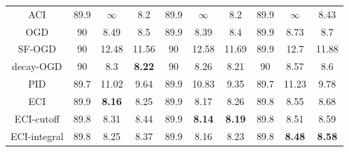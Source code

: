 \begin{table}[ht]
\begin{center}
\begin{tabular}{c|ccc|ccc|ccc}
ACI                   & 89.9 & $\infty$           & 8.2           & 89.9 & $\infty$           & 8.2           & 89.9 & $\infty$           & 8.43          \\
OGD                   & 90   & 8.49          & 8.5           & 89.9 & 8.39          & 8.4           & 89.9 & 8.73          & 8.7           \\
SF-OGD                & 90   & 12.48         & 11.56         & 90   & 12.58         & 11.69         & 89.9 & 12.7          & 11.88         \\
decay-OGD             & 90   & 8.3           & \textbf{8.22} & 90   & 8.26          & 8.21          & 90   & 8.57          & 8.6           \\
PID                   & 89.7 & 11.02         & 9.64          & 89.9 & 10.83         & 9.35          & 89.7 & 11.23         & 9.78          \\
ECI                   & 89.9 & \textbf{8.16} & 8.25          & 89.9 & 8.17          & 8.26          & 89.8 & 8.55          & 8.68          \\
ECI-cutoff            & 89.8 & 8.31          & 8.44          & 89.9 & \textbf{8.14} & \textbf{8.19} & 89.8 & 8.51          & 8.59          \\
ECI-integral          & 89.8 & 8.25          & 8.37          & 89.9 & 8.16          & 8.23          & 89.8 & \textbf{8.48} & \textbf{8.58}                \\ \hline
\end{tabular}
\end{center}
\end{table}


